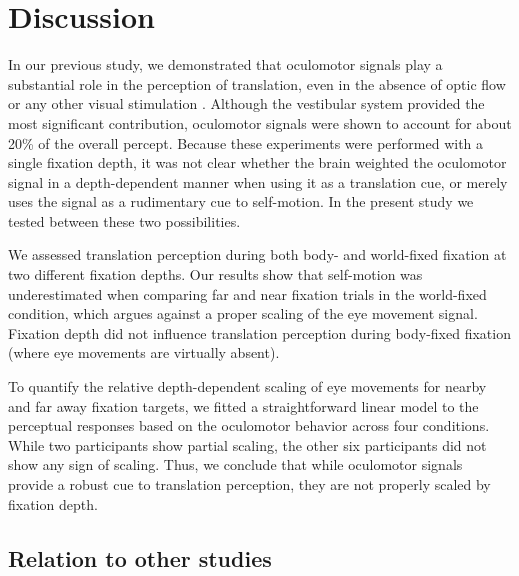 \section{Discussion}

In our previous study, we demonstrated that oculomotor signals play a substantial role in the perception of translation, even in the absence of optic flow or any other visual stimulation \cite{clemens2015a}. Although the vestibular system provided the most significant contribution, oculomotor signals were shown to account for about 20\% of the overall percept. Because these experiments were performed with a single fixation depth, it was not clear whether the brain weighted the oculomotor signal in a depth-dependent manner when using it as a translation cue, or merely uses the signal as a rudimentary cue to self-motion. In the present study we tested between these two possibilities.

We assessed translation perception during both body- and world-fixed fixation at two different fixation depths. Our results show that self-motion was underestimated when comparing far and near fixation trials in the world-fixed condition, which argues against a proper scaling of the eye movement signal. Fixation depth did not influence translation perception during body-fixed fixation (where eye movements are virtually absent).

To quantify the relative depth-dependent scaling of eye movements for nearby and far away fixation targets, we fitted a straightforward linear model to the perceptual responses based on the oculomotor behavior across four conditions. While two participants show partial scaling, the other six participants did not show any sign of scaling. Thus, we conclude that while oculomotor signals provide a robust cue to translation perception, they are not properly scaled by fixation depth.


\subsection{Relation to other studies}

